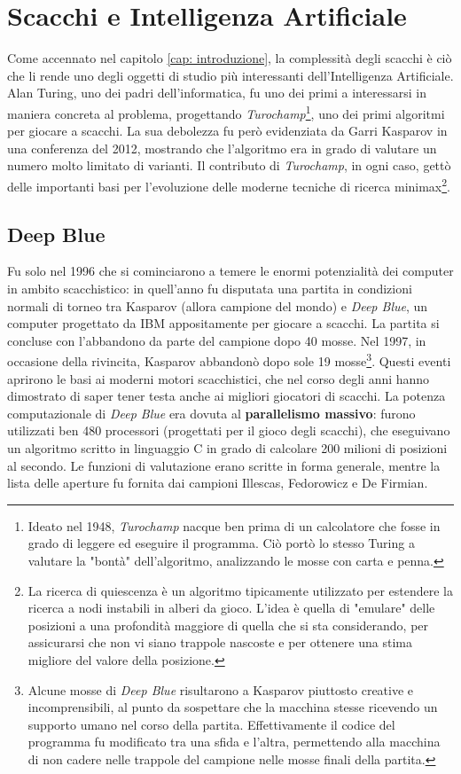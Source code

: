 \section{Scacchi e Intelligenza Artificiale}
Come accennato nel capitolo \ref{cap: introduzione}, la complessità degli scacchi è ciò che li rende uno degli oggetti di studio più interessanti 
dell'Intelligenza Artificiale. Alan Turing, uno dei padri dell'informatica, fu uno dei primi a interessarsi in maniera concreta al problema, progettando 
\textit{Turochamp}\footnote{Ideato nel 1948, \textit{Turochamp} nacque ben prima di un calcolatore che fosse in grado di 
leggere ed eseguire il programma. Ciò portò lo stesso Turing a valutare la "bontà" dell'algoritmo, analizzando le mosse con carta e penna.}, uno dei primi algoritmi per giocare a scacchi.
La sua debolezza fu però evidenziata da Garri Kasparov in una conferenza del 2012, mostrando che l'algoritmo era 
in grado di valutare un numero molto limitato di varianti. Il contributo di \textit{Turochamp}, in ogni caso, gettò delle importanti basi 
per l'evoluzione delle moderne tecniche di ricerca minimax\footnote{La ricerca di quiescenza è un algoritmo tipicamente utilizzato per estendere la ricerca a nodi instabili
in alberi da gioco. L'idea è quella di "emulare" delle posizioni a una profondità maggiore di quella che si sta considerando, per assicurarsi
che non vi siano trappole nascoste e per ottenere una stima migliore del valore della posizione.}. 
\subsection{Deep Blue}
Fu solo nel 1996 che si cominciarono a temere le enormi potenzialità dei computer in ambito scacchistico: in quell'anno fu disputata 
una partita in condizioni normali di torneo tra Kasparov (allora campione del mondo) e \textit{Deep Blue}, un computer progettato 
da IBM appositamente per giocare a scacchi. La partita si concluse con l'abbandono da parte del campione dopo 40 mosse. Nel 1997, in occasione della rivincita, 
Kasparov abbandonò dopo sole 19 mosse\footnote{Alcune mosse di \textit{Deep Blue} risultarono a Kasparov piuttosto creative e incomprensibili,
al punto da sospettare che la macchina stesse ricevendo un supporto umano nel corso della partita. Effettivamente il codice del programma 
fu modificato tra una sfida e l'altra, permettendo alla macchina di non cadere nelle trappole del campione nelle mosse finali della partita.}. 
Questi eventi aprirono le basi ai moderni motori scacchistici, che nel corso degli anni hanno dimostrato di saper tener testa anche 
ai migliori giocatori di scacchi.
La potenza computazionale di \textit{Deep Blue} era dovuta al \textbf{parallelismo massivo}: furono utilizzati ben 480 processori (progettati per il gioco degli 
scacchi), che eseguivano un algoritmo scritto in linguaggio C in grado di calcolare 200 milioni di posizioni al secondo. Le funzioni di 
valutazione erano scritte in forma generale, mentre la lista delle aperture fu fornita dai campioni Illescas, Fedorowicz e De Firmian.

